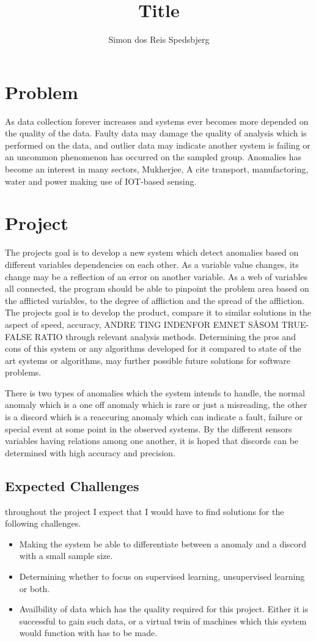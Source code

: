 \documentclass[a4paper,8pt]{article}
\title{Title}
\author{Simon dos Reis Spedsbjerg}
\begin{document}
	\maketitle
	
	\section{Problem}
	As data collection forever increases and systems ever becomes more depended on the quality of the data. Faulty data may damage the quality of analysis which is performed on the data, and outlier data may indicate another system is failing or an uncommon phenomenon has occurred on the sampled group. Anomalies has become an interest in many sectors, Mukherjee, A\cite{MUKHERJEE2024102444} cite transport, manufactoring, water and power making use of IOT-based sensing.
	
	\section{Project}
	The projects goal is to develop a new system which detect anomalies based on different variables dependencies on each other. As a variable value changes, its change may be a reflection of an error on another variable. As a web of variables all connected, the program should be able to pinpoint the problem area based on the afflicted variables, to the degree of affliction and the spread of the affliction. The projects goal is to develop the product, compare it to similar solutions in the aspect of speed, accuracy, ANDRE TING INDENFOR EMNET SÅSOM TRUE-FALSE RATIO through relevant analysis methods. Determining the pros and cons of this system or any algorithms developed for it compared to state of the art systems or algorithms, may further possible future solutions for software problems.
	
	There is two types of anomalies which the system intends to handle, the normal anomaly which is a one off anomaly which is rare or just a misreading, the other is a discord which is a reaccuring anomaly which can indicate a fault, failure or special event at some point in the observed systems. By the different sensors variables having relations among one another, it is hoped that discords can be determined with high accuracy and precision.
	
	\subsection{Expected Challenges}
		throughout the project I expect that I would have to find solutions for the following challenges.
		\begin{itemize}
			\item Making the system be able to differentiate between a anomaly and a discord with a small sample size.
			\item Determining whether to focus on supervised learning, unsupervised learning or both.
			\item Availbility of data which has the quality required for this project. Either it is successful to gain such data, or a virtual twin of machines which this system would function with has to be made.
		\end{itemize}
\end{document}
